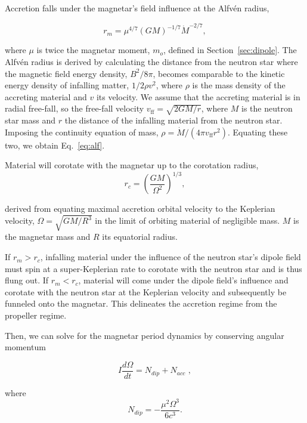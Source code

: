 \documentclass{article}
\begin{document}
Accretion falls under the magnetar's field influence at the Alfv\'en radius,

\begin{equation} \label{eq:alf}
r_m=\mu^{4/7}(G M)^{-1/7} \dot{M}^{-2/7},
\end{equation}

where $\mu$ is twice the magnetar moment, $m_o$, defined in Section~\ref{sec:dipole}. The Alfv\'en radius is derived by calculating the distance from the neutron star where the magnetic field energy density, $B^2/8\pi$, becomes comparable to the kinetic energy density of infalling matter, $1/2 \rho v^2$, where $\rho$ is the mass density of the accreting material and $v$ its velocity. We assume that the accreting material is in radial free-fall, so the free-fall velocity $v_{\mathrm{ff}}=\sqrt{2 G M/r}$, where $M$ is the neutron star mass and $r$ the distance of the infalling material from the neutron star. Imposing the continuity equation of mass, $\rho= \dot{M}/(4\pi v_{\mathrm{ff}}r^2)$. Equating these two, we obtain Eq.~\ref{eq:alf}.

Material will corotate with the magnetar up to the corotation radius,
\begin{equation}
r_c={\left(\frac{GM}{\Omega^2}\right)}^{1/3},
\end{equation}

derived from equating maximal accretion orbital velocity to the Keplerian velocity, $\Omega=\sqrt{GM/R^3}$ in the limit of orbiting material of negligible mass. $M$ is the magnetar mass and $R$ its equatorial radius.

If $r_m>r_c$, infalling material under the influence of the neutron star's dipole field must spin at a super-Keplerian rate to corotate with the neutron star and is thus flung out. If $r_m<r_c$, material will come under the dipole field's influence and corotate with the neutron star at the Keplerian velocity and subsequently be funneled onto the magnetar. This delineates the accretion regime from the propeller regime.

Then, we can solve for the magnetar period dynamics by conserving angular momentum

\begin{equation}
I \frac{d\Omega}{dt} = N_{dip} + N_{acc}\,\,,
\end{equation}

where
\begin{equation}
N_{dip}= -\frac{\mu^{2}\Omega^{3}}{6 c^{3}}.
\end{equation}
\end{document}
